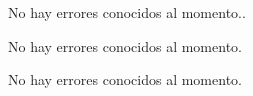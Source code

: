 
\begin{DoxyRefList}
\item[\label{bug__bug000001}%
\hypertarget{bug__bug000001}{}%
File \hyperlink{bubble__sort_8c}{bubble\+\_\+sort.c} ]No hay errores conocidos al momento..  
\item[\label{bug__bug000002}%
\hypertarget{bug__bug000002}{}%
File \hyperlink{bubble__sort_8h}{bubble\+\_\+sort.h} ]No hay errores conocidos al momento.  
\item[\label{bug__bug000003}%
\hypertarget{bug__bug000003}{}%
File \hyperlink{main_8c}{main.c} ]No hay errores conocidos al momento. 
\end{DoxyRefList}